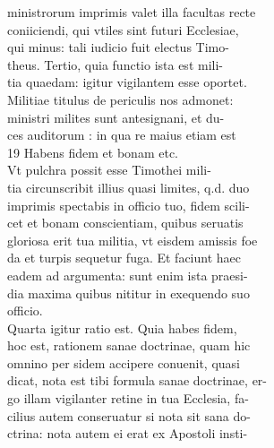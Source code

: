 \documentclass{article}
\begin{document}
\begin{pages}
                ministrorum imprimis valet illa facultas recte \\
                coniiciendi, qui vtiles sint futuri Ecclesiae, \\
                qui minus: tali iudicio fuit electus Timo- \\
                theus. Tertio, quia functio ista est mili- \\
                tia quaedam: igitur vigilantem esse oportet. \\
                Militiae titulus de periculis nos admonet: \\
                ministri milites sunt antesignani, et du- \\
                ces auditorum : in qua re maius etiam est \\
                19 Habens fidem et bonam etc. \\
                Vt pulchra possit esse Timothei mili- \\
                tia circunscribit illius quasi limites, q.d. duo \\
                imprimis spectabis in officio tuo, fidem scili- \\
                cet et bonam conscientiam, quibus seruatis \\
                gloriosa erit tua militia, vt eisdem amissis foe \\
                da et turpis sequetur fuga. Et faciunt haec \\
                eadem ad argumenta: sunt enim ista praesi- \\
                dia maxima quibus nititur in exequendo suo \\
                officio. \\
                Quarta igitur ratio est. Quia habes fidem, \\
                hoc est, rationem sanae doctrinae, quam hic \\
                omnino per sidem accipere conuenit, quasi \\
                dicat, nota est tibi formula sanae doctrinae, er- \\
                go illam vigilanter retine in tua Ecclesia, fa- \\
                cilius autem conseruatur si nota sit sana do- \\
                ctrina: nota autem ei erat ex Apostoli insti- \\

\end{pages}
\end{document}
